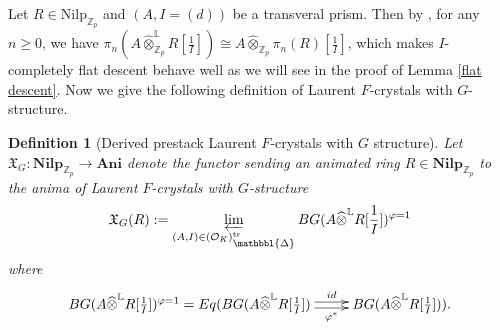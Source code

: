 \documentclass[10pt]{article}
\newtheorem{dfn}[thm]{Definition}
\numberwithin{equation}{section}
\newcommand{\frakX}{{\mathfrak X}}
\newcommand{\bL}{{\mathbb L}}
\newcommand{\bZ}{{\mathbb Z}}
\newcommand{\calO}{{\mathcal O}}
\newcommand{\Nilp}{\mathrm{Nilp}}
\newcommand{\Prism}{{\mathlarger{\mathbbl{\Delta}}}} %
\begin{document}
Let $R\in \Nilp_{\bZ_p}$ and $(A,I=(d))$ be a transveral prism. Then by \cite[Lemma 3.28]{Min23}, for any $n\geq 0$, we have $\pi_n(A\widehat\otimes^{\bL}_{\bZ_p}R[\frac{1}{I}])\cong A\widehat\otimes_{\bZ_p}\pi_n(R)[\frac{1}{I}]$, which makes $I$-completely flat descent behave well as we will see in the proof of Lemma \ref{flat descent}. Now we give the following definition of Laurent $F$-crystals with $G$-structure.




\begin{dfn}[Derived prestack Laurent $F$-crystals with $G$ structure]
Let $\frakX_G:\textbf{Nilp}_{\bZ_p}\to \textbf{Ani}$ denote the functor sending an animated ring $R\in  \textbf{Nilp}_{\bZ_p}$ to the anima of Laurent $F$-crystals with $G$-structure 
\[
\frakX_G(R):=\varprojlim_{(A,I)\in (\calO_K)_{\Prism}^{\rm tr}}BG(A\widehat\otimes^{\bL}R[\frac{1}{I}])^{\varphi=1}
\]
where 
\begin{equation*}
    \xymatrix{
    BG(A\widehat\otimes^{\bL}R[\frac{1}{I}])^{\varphi=1}=Eq(BG(A\widehat\otimes^{\bL}R[\frac{1}{I}])\ar@<.5ex>[r]^-{id}\ar@<-.5ex>[r]_-{\varphi^*}&BG(A\widehat\otimes^{\bL}R[\frac{1}{I}])).
    }
\end{equation*}
    
\end{dfn}
\end{document}
